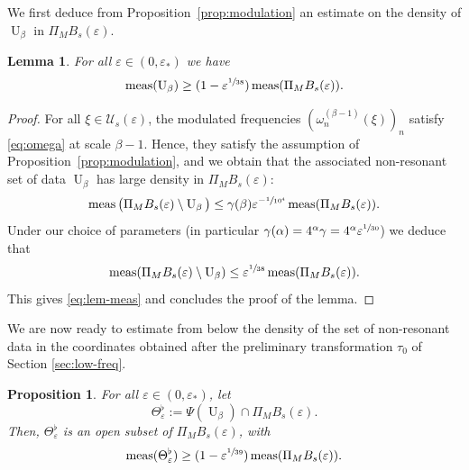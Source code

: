 \documentclass[JEP,XML,SOM,Unicode,published]{cedram}
\theoremstyle{plain}
\newtheorem{proposition}[theorem]{Proposition}
\newtheorem{lemma}[theorem]{Lemma}
\theoremstyle{definition}
\DeclareMathOperator{\meas}{meas}
\newcommand{\1}{\mathbf{1}}
\let\epsilon\varepsilon
\begin{document}
We first deduce from Proposition~\ref{prop:modulation} an estimate on the density of $\operatorname{U}_{\beta}$ in $\Pi_{M}B_{s}(\epsilon)$.
\begin{lemma}
\label{lem:meas-}
For all $\epsilon\in(0,\epsilon_{\ast})$ we have
\begin{equation}
\label{eq:lem-meas}
\meas(\operatorname{U}_{\beta})
\geq
(1 - \epsilon^{\sfrac{1}{38}})
\meas(\Pi_{M}B_{s}(\epsilon)).
\end{equation}
\end{lemma}
\begin{proof}
For all $\xi\in\mathcal{U}_{s}(\epsilon)$, the modulated frequencies $(\omega_{n}^{(\beta-1)}(\xi))_{n}$ satisfy \eqref{eq:omega} at scale $\beta-1$. Hence, they satisfy the assumption of Proposition~\ref{prop:modulation}, and we obtain that the associated non-resonant set of data $\operatorname{U}_{\beta}$ has large density in $\Pi_{M}B_{s}(\epsilon)$:
\[
\meas\big(
\Pi_{M}B_{s}(\epsilon)\setminus \operatorname{U}_{\beta}
\big)
\leq
\gamma(\beta)\epsilon^{-\sfrac{1}{10^{4}}}\meas(\Pi_{M}B_{s}(\epsilon)).
\]
Under our choice of parameters (in particular $\gamma(\alpha)=4^{\alpha}\gamma=4^{\alpha}\epsilon^{\sfrac{1}{30}}$) we deduce that
\[
\meas(\Pi_{M}B_{s}(\epsilon)
\setminus\operatorname{U}_{\beta})
\leq
\epsilon^{\sfrac{1}{38}}\meas(\Pi_{M}B_{s}(\epsilon)).
\]
This gives \eqref{eq:lem-meas} and concludes the proof of the lemma.
\end{proof}
We are now ready to estimate from below the density of the set of non-resonant data in the coordinates obtained after the preliminary transformation $\tau_{0}$ of Section \ref{sec:low-freq}.
\begin{proposition}
\label{prop:xi0} For all $\epsilon\in(0,\epsilon_{\ast})$, let
\begin{equation}
\label{eq:theta}
\Theta_{\epsilon}^{\flat}
:=
\Psi(\operatorname{U}_{\beta})
\cap
\Pi_{M}B_{s}(\epsilon).
\end{equation}
Then, $\Theta_{\epsilon}^{\flat}$ is an open subset of $\Pi_{M}B_{s}(\epsilon)$, with
\begin{equation}
\meas(\Theta_{\epsilon}^{\flat})\geq(1-\epsilon^{\sfrac{1}{39}})\meas(\Pi_{M}B_{s}(\epsilon)).
\end{equation}
\end{proposition}
\end{document}
